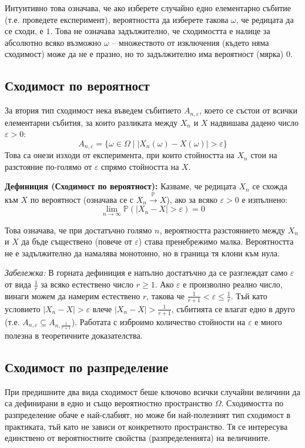 \documentclass{article}
\begin{document}
Интуитивно това означава, че ако изберете случайно едно елементарно събитие (т.е. проведете експеримент), вероятността да изберете такова $\omega$, че редицата да се сходи, е $1$. Това не означава задължително, че сходимостта е налице за абсолютно всяко възможно $\omega$ – множеството от изключения (където няма сходимост) може да не е празно, но то задължително има вероятност (мярка) 0. 

\subsection{Сходимост по вероятност}

За втория тип сходимост нека въведем събитието $A_{n, \varepsilon}$, което се състои от всички елементарни събития, за които разликата между $X_n$ и $X$ надвишава дадено число $\varepsilon > 0$:
\[
A_{n, \varepsilon} = \{ \omega \in \Omega \mid |X_n(\omega) - X(\omega)| > \varepsilon \}
\]
Това са онези изходи от експеримента, при които стойността на $X_n$ стои на разстояние по-голямо от $\varepsilon$ спрямо стойността на $X$.

\textbf{Дефиниция (Сходимост по вероятност):} Казваме, че редицата $X_n$ се схожда към $X$ по вероятност (означава се с $X_n \xrightarrow{\mathbb{P}} X$), ако за всяко $\varepsilon > 0$ е изпълнено:
\[
\lim_{n \to \infty} \mathbb{P}(|X_n - X| > \varepsilon) = 0
\]

Това означава, че при достатъчно голямо $n$, вероятността разстоянието между $X_n$ и $X$ да бъде съществено (повече от $\varepsilon$) става пренебрежимо малка. Вероятността не е задължително да намалява монотонно, но в граница тя клони към нула.

\emph{Забележка:} В горната дефиниция е напълно достатъчно да се разглеждат само $\varepsilon$ от вида $\frac{1}{r}$ за всяко естествено число $r \ge 1$. Ако $\varepsilon$ е произволно реално число, винаги можем да намерим естествено $r$, такова че $\frac{1}{r+1} < \varepsilon \le \frac{1}{r}$. Тъй като условието $|X_n - X| > \varepsilon$ влече $|X_n - X| > \frac{1}{r+1}$, събитията се влагат едно в друго (т.е. $A_{n, \varepsilon} \subseteq A_{n, \frac{1}{r+1}}$). Работата с изброимо количество стойности на $\varepsilon$ е много полезна в теоретичните доказателства.

\subsection{Сходимост по разпределение}

При предишните два вида сходимост беше ключово всички случайни величини да са дефинирани в едно и също вероятностно пространство $\Omega$. Сходимостта по разпределение обаче е най-слабият, но може би най-полезният тип сходимост в практиката, тъй като не зависи от конкретното пространство. Тя се интересува единствено от вероятностните свойства (разпределенията) на величините.
\end{document}
